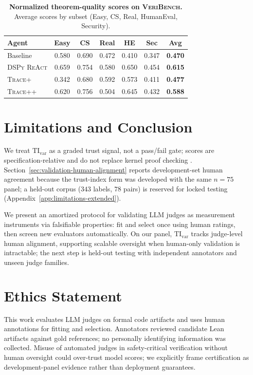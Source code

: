 \documentclass{article}
\begin{document}
\begin{table}[t]
  \centering
  \small
  \begin{tabular}{lcccccc}
    \toprule
    \textbf{Agent}      & \textbf{Easy} & \textbf{CS} & \textbf{Real} & \textbf{HE} & \textbf{Sec} & \textbf{Avg}   \\
    \midrule
    Baseline            & 0.580         & 0.690       & 0.472         & 0.410       & 0.347        & \textbf{0.470} \\
    \textsc{DSPy ReAct} & 0.659         & 0.754       & 0.580         & 0.650       & 0.454        & \textbf{0.615} \\
    \textsc{Trace+}     & 0.342         & 0.680       & 0.592         & 0.573       & 0.411        & \textbf{0.477} \\
    \textsc{Trace++}    & 0.620         & 0.756       & 0.504         & 0.645       & 0.432        & \textbf{0.588} \\
    \bottomrule
  \end{tabular}
  \caption{\textbf{Normalized theorem-quality scores on \textsc{VeriBench}.} Average scores by subset (Easy, CS, Real, HumanEval, Security).}
  \label{tab:theorem_quality_table_split}
\end{table}

\section{Limitations and Conclusion}
\label{sec:limitations-finite}
We treat \(\mathrm{TI}_{\mathrm{var}}\) as a graded trust signal, not a pass/fail gate; scores are specification-relative and do not replace kernel proof checking \citep{rice1953}.
Section~\ref{sec:validation-human-alignment} reports development-set human agreement because the trust-index form was developed with the same \(n=75\) panel; a held-out corpus (\(343\) labels, \(78\) pairs) is reserved for locked testing (Appendix~\ref{app:limitations-extended}).

We present an amortized protocol for validating LLM judges as measurement instruments via falsifiable properties: fit and select once using human ratings, then screen new evaluators automatically.
On our panel, \(\mathrm{TI}_{\mathrm{var}}\) tracks judge-level human alignment, supporting scalable oversight when human-only validation is intractable; the next step is held-out testing with independent annotators and unseen judge families.

\section*{Ethics Statement}
This work evaluates LLM judges on formal code artifacts and uses human annotations for fitting and selection. Annotators reviewed candidate Lean artifacts against gold references; no personally identifying information was collected. Misuse of automated judges in safety-critical verification without human oversight could over-trust model scores; we explicitly frame certification as development-panel evidence rather than deployment guarantees.
\end{document}
